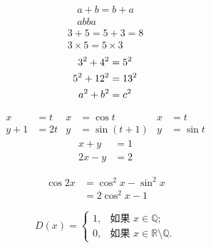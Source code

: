 \documentclass{ctexart}
\begin{document}
	\begin{gather}
		a+b=b+a\\
		ab ba
	\end{gather}
	\begin{gather*}
		3+5=5+3=8\\
		3 \times 5 = 5 \times 3
	\end{gather*}
	\begin{gather}
		3^2 + 4^2 = 5^2 \notag \\
		5^2 + 12^2 = 13^2 \notag \\
		a^2 + b^2 = c^2 \notag 
	\end{gather}

	\begin{align}
		x &=t & x &= \cos t & x &=t \\
		y+1 &= 2t & y &= \sin(t+1) & y &= \sin t
	\end{align}
	\begin{align*}
		x+y & = 1\\
		2x-y & = 2
	\end{align*}

	\begin{equation}
		\begin{split}
			\cos 2x & = \cos^2 x - \sin^2 x \\
			&= 2\cos^2 x - 1
		\end{split}
	\end{equation}

	\begin{equation}
		D(x) = \begin{cases}
			1, & \text{如果 }x \in \mathbb{Q}; \\
			0, & \text{如果 }x \in
			\mathbb{R}\setminus\mathbb{Q}.
		\end{cases}
	\end{equation}

	
\end{document}
